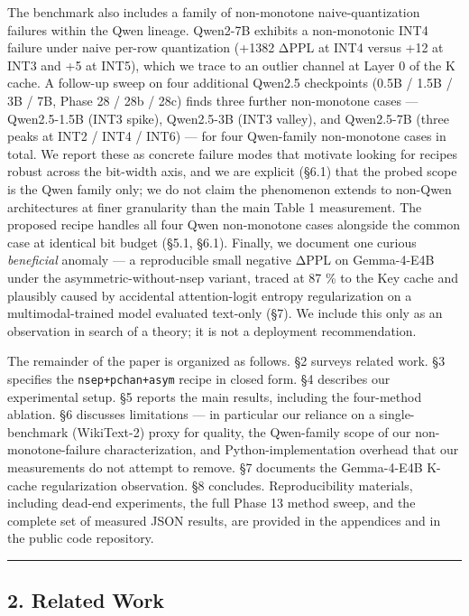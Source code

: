 The benchmark also includes a family of non-monotone naive-quantization
failures within the Qwen lineage. Qwen2-7B exhibits a non-monotonic INT4
failure under naive per-row quantization (+1382 ΔPPL at INT4 versus +12
at INT3 and +5 at INT5), which we trace to an outlier channel at Layer 0
of the K cache. A follow-up sweep on four additional Qwen2.5 checkpoints
(0.5B / 1.5B / 3B / 7B, Phase 28 / 28b / 28c) finds three further
non-monotone cases --- Qwen2.5-1.5B (INT3 spike), Qwen2.5-3B (INT3
valley), and Qwen2.5-7B (three peaks at INT2 / INT4 / INT6) --- for four
Qwen-family non-monotone cases in total. We report these as concrete
failure modes that motivate looking for recipes robust across the
bit-width axis, and we are explicit (§6.1) that the probed scope is the
Qwen family only; we do not claim the phenomenon extends to non-Qwen
architectures at finer granularity than the main Table 1 measurement.
The proposed recipe handles all four Qwen non-monotone cases alongside
the common case at identical bit budget (§5.1, §6.1). Finally, we
document one curious \emph{beneficial} anomaly --- a reproducible small
negative ΔPPL on Gemma-4-E4B under the asymmetric-without-nsep variant,
traced at 87 \% to the Key cache and plausibly caused by accidental
attention-logit entropy regularization on a multimodal-trained model
evaluated text-only (§7). We include this only as an observation in
search of a theory; it is not a deployment recommendation.

The remainder of the paper is organized as follows. §2 surveys related
work. §3 specifies the \texttt{nsep+pchan+asym} recipe in closed form.
§4 describes our experimental setup. §5 reports the main results,
including the four-method ablation. §6 discusses limitations --- in
particular our reliance on a single-benchmark (WikiText-2) proxy for
quality, the Qwen-family scope of our non-monotone-failure
characterization, and Python-implementation overhead that our
measurements do not attempt to remove. §7 documents the Gemma-4-E4B
K-cache regularization observation. §8 concludes. Reproducibility
materials, including dead-end experiments, the full Phase 13 method
sweep, and the complete set of measured JSON results, are provided in
the appendices and in the public code repository.

\begin{center}\rule{0.5\linewidth}{0.5pt}\end{center}

\subsection{2. Related Work}\label{related-work}

